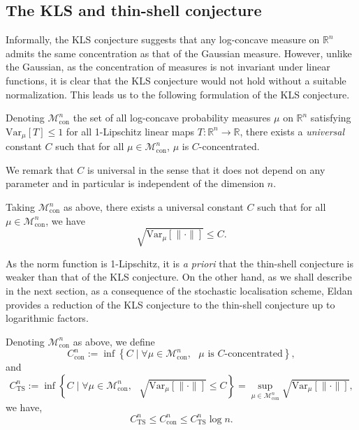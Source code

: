 \subsection{The KLS and thin-shell conjecture}

Informally, the KLS conjecture suggests that any log-concave measure on \(\mathbb{R}^n\) admits 
the same concentration as that of the Gaussian measure. However, unlike the Gaussian, as the 
concentration of measures is not invariant under linear functions, it is clear that the KLS 
conjecture would not hold without a suitable normalization. This leads us to the following formulation 
of the KLS conjecture.

\begin{conjecture}\label{conj:KLS}
  Denoting \(\mathscr{M}^n_{\text{con}}\) the set of all log-concave probability measures \(\mu\) on 
  \(\mathbb{R}^n\) satisfying \(\text{Var}_\mu[T] \le 1\) for all 1-Lipschitz linear maps 
  \(T : \mathbb{R}^n \to \mathbb{R}\), there exists a \textit{universal} constant \(C\) such that for all 
  \(\mu \in \mathscr{M}^n_{\text{con}}\), \(\mu\) is \(C\)-concentrated.
\end{conjecture}

We remark that \(C\) is universal in the sense that it does not depend on any parameter and in 
particular is independent of the dimension \(n\).

\begin{conjecture}
  Taking \(\mathscr{M}^n_{\text{con}}\) as above, there exists a universal constant \(C\) such that 
  for all \(\mu \in \mathscr{M}^n_{\text{con}}\), we have
  \[\sqrt{\text{Var}_\mu[\|\cdot\|]} \le C.\]
\end{conjecture}

As the norm function is 1-Lipschitz, it is \textit{a priori} that the thin-shell conjecture is 
weaker than that of the KLS conjecture. On the other hand, as we shall describe in the next section, 
as a consequence of the stochastic localisation scheme, Eldan \cite{Eldan_2013} provides a reduction 
of the KLS conjecture to the thin-shell conjecture up to logarithmic factors. 

\begin{theorem}\label{thm:KLS_to_TS}
  Denoting \(\mathscr{M}^n_{\text{con}}\) as above, we define 
  \[C^n_{\text{con}} := \inf \left\{C \mid \text{\(\forall \mu \in \mathscr{M}^n_{\text{con}},\) 
    \(\mu\) is \(C\)-concentrated}\right\},\]
  and 
  \[C^n_{\text{TS}} := \inf \left\{C \mid \text{\(\forall \mu \in \mathscr{M}^n_{\text{con}},\) 
      \(\sqrt{\text{Var}_\mu[\|\cdot\|]} \le C\)}\right\}
      = \sup_{\mu \in \mathscr{M}^n_{\text{con}}} \sqrt{\text{Var}_\mu[\|\cdot\|]},\]
  we have,
  \[C^n_{\text{TS}} \le C^n_{\text{con}} \le C^n_{\text{TS}} \log n.\]
\end{theorem}

